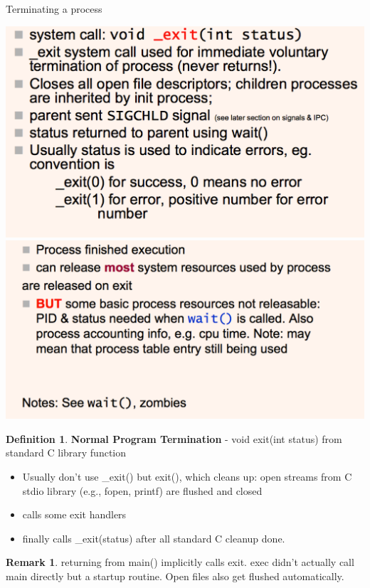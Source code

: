 \documentclass[11pt,a4paper]{article}
\theoremstyle{definition}
\newtheorem*{remark}{Remark}
\newtheorem{definition}{Definition}[section]
\newenvironment{myitemize}
{ \begin{itemize}
    \setlength{\itemsep}{5pt}
    \setlength{\parskip}{0pt}
    \setlength{\parsep}{0pt}     }
{ \end{itemize}                  }
\begin{document}
\begin{tcolorbox}
	\textsf{Terminating a process}
	
	\includegraphics[scale=0.27]{m1/terminatingProcess1}
	\includegraphics[scale=0.27]{m1/terminatingProcess2}
	\centering
\end{tcolorbox}

\begin{definition}{\textbf{Normal Program Termination} - \textsf{void exit(int status)} from standard C library function}
	\begin{myitemize}
		\item Usually don't use \textsf{\_exit()} but \textsf{exit()}, which cleans up: open streams from C stdio library (e.g., \textsf{fopen}, \textsf{printf}) are flushed and closed
		\item calls some \textsf{exit} handlers
		\item finally calls \textsf{\_exit(status)} after all standard C cleanup done.
	\end{myitemize}
\end{definition}
\begin{remark}
	returning from \textsf{main()} implicitly calls \textsf{exit}. \textsf{exec} didn't actually call main directly but a startup routine. Open files also get flushed automatically.
\end{remark}
\end{document}

